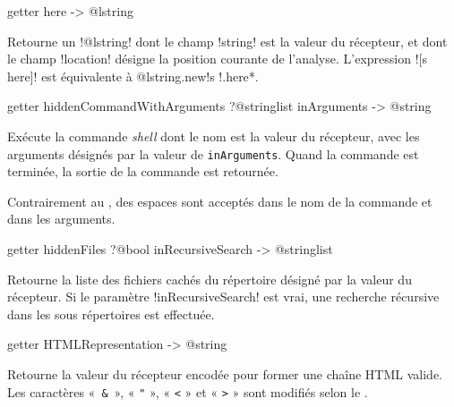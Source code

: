 
\begin{galgasbox}
getter here -> @lstring
\end{galgasbox}

Retourne un \ggs!@lstring! dont le champ \ggs!string! est la valeur du récepteur, et dont le champ \ggs!location! désigne la position courante de l'analyse. L'expression \ggs![s here]! est équivalente à \ggs*@lstring.new{!s !.here}*.













\begin{galgasbox}
getter hiddenCommandWithArguments ?@stringlist inArguments -> @string
\end{galgasbox}
Exécute la commande \emph{shell} dont le nom est la valeur du récepteur, avec les arguments désignés par la valeur de \texttt{inArguments}. Quand la commande est terminée, la sortie de la commande est retournée.

Contrairement au , des espaces sont acceptés dans le nom de la commande et dans les arguments.









\begin{galgasbox}
getter hiddenFiles ?@bool inRecursiveSearch -> @stringlist
\end{galgasbox}

Retourne la liste des fichiers cachés du répertoire désigné par la valeur du récepteur. Si le paramètre \ggs!inRecursiveSearch! est vrai, une recherche récursive dans les sous répertoires est effectuée.











\begin{galgasbox}
getter HTMLRepresentation -> @string
\end{galgasbox}
Retourne la valeur du récepteur encodée pour former une chaîne HTML valide. Les caractères «~\texttt{\&}~», « \texttt{"} », « \texttt{<} » et « \texttt{>} » sont modifiés selon le .



